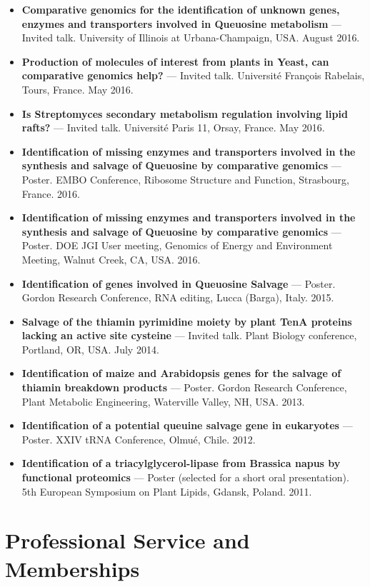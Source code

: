 \documentclass[10pt,a4paper]{article}
\begin{document}
\begin{itemize}[leftmargin=1.1em]
\item \textbf{Comparative genomics for the identification of unknown genes, enzymes and transporters involved in Queuosine metabolism} --- Invited talk. University of Illinois at Urbana-Champaign, USA. August 2016.
\item \textbf{Production of molecules of interest from plants in Yeast, can comparative genomics help?} --- Invited talk. Université François Rabelais, Tours, France. May 2016.
\item \textbf{Is Streptomyces secondary metabolism regulation involving lipid rafts?} --- Invited talk. Université Paris 11, Orsay, France. May 2016.
\item \textbf{Identification of missing enzymes and transporters involved in the synthesis and salvage of Queuosine by comparative genomics} --- Poster. EMBO Conference, Ribosome Structure and Function, Strasbourg, France. 2016.
\item \textbf{Identification of missing enzymes and transporters involved in the synthesis and salvage of Queuosine by comparative genomics} --- Poster. DOE JGI User meeting, Genomics of Energy and Environment Meeting, Walnut Creek, CA, USA. 2016.
\item \textbf{Identification of genes involved in Queuosine Salvage} --- Poster. Gordon Research Conference, RNA editing, Lucca (Barga), Italy. 2015.
\item \textbf{Salvage of the thiamin pyrimidine moiety by plant TenA proteins lacking an active site cysteine} --- Invited talk. Plant Biology conference, Portland, OR, USA. July 2014.
\item \textbf{Identification of maize and Arabidopsis genes for the salvage of thiamin breakdown products} --- Poster. Gordon Research Conference, Plant Metabolic Engineering, Waterville Valley, NH, USA. 2013.
\item \textbf{Identification of a potential queuine salvage gene in eukaryotes} --- Poster. XXIV tRNA Conference, Olmué, Chile. 2012.
\item \textbf{Identification of a triacylglycerol-lipase from Brassica napus by functional proteomics} --- Poster (selected for a short oral presentation). 5th European Symposium on Plant Lipids, Gdansk, Poland. 2011.
\end{itemize}

\section*{Professional Service and Memberships}
\end{document}

